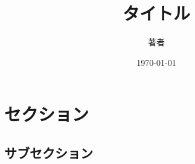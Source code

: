 \documentclass[twocolumn, a4j, 10pt]{jarticle}
\title{タイトル}
\author{著者}
\date{\today}
\begin{document}
  \maketitle
  \section{セクション}
  \subsection{サブセクション}
\end{document}
